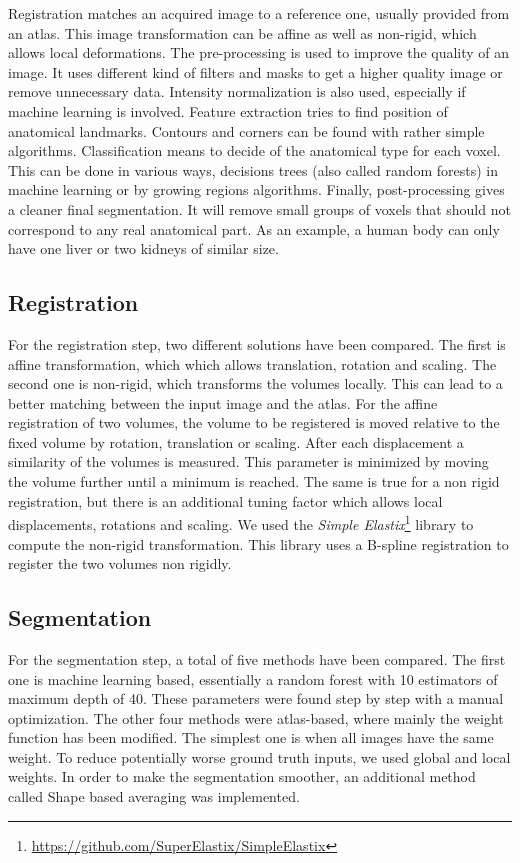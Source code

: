 Registration matches an acquired image to a reference one, usually provided from an atlas. This image transformation can be affine as well as non-rigid, which allows local deformations. The pre-processing is used to improve the quality of an image. It uses different kind of filters and masks to get a higher quality image or remove unnecessary data. Intensity normalization is also used, especially if machine learning is involved. Feature extraction tries to find position of anatomical landmarks. Contours and corners can be found with rather simple algorithms. Classification means to decide of the anatomical type for each voxel. This can be done in various ways, decisions trees (also called random forests) in machine learning or by growing regions algorithms. Finally, post-processing gives a cleaner final segmentation. It will remove small groups of voxels that should not correspond to any real anatomical part. As an example, a human body can only have one liver or two kidneys of similar size.

\subsection*{Registration}
For the registration step, two different solutions have been compared. The first is affine transformation, which which allows translation, rotation and scaling. The second one is non-rigid, which transforms the volumes locally. This can lead to a better matching between the input image and the atlas. For the affine registration of two volumes, the volume to be registered is moved relative to the fixed volume by rotation, translation or scaling. After each displacement a similarity of the volumes is measured. This parameter is minimized by moving the volume further until a minimum is reached. The same is true for a non rigid registration, but there is an additional tuning factor which allows local displacements, rotations and scaling. We used the \textit{Simple Elastix}\footnote{\url{https://github.com/SuperElastix/SimpleElastix}} library to compute the non-rigid transformation. This library uses a B-spline registration to register the two volumes non rigidly.

\subsection*{Segmentation}
For the segmentation step, a total of five methods have been compared. The first one is machine learning based, essentially a random forest with 10 estimators of maximum depth of 40. These parameters were found step by step with a manual optimization. The other four methods were atlas-based, where mainly the weight function has been modified. The simplest one is when all images have the same weight. To reduce potentially worse ground truth inputs, we used global and local weights. In order to make the segmentation smoother, an additional method called Shape based averaging was implemented.

